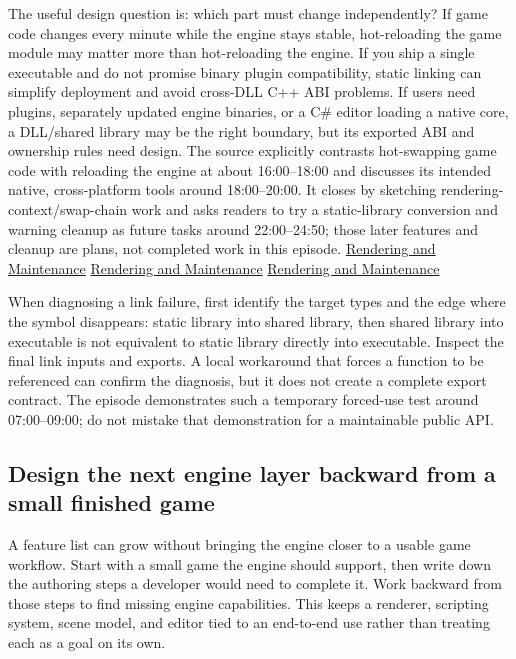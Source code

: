 The useful design question is: which part must change independently? If game code changes every minute while the engine stays stable, hot-reloading the game module may matter more than hot-reloading the engine. If you ship a single executable and do not promise binary plugin compatibility, static linking can simplify deployment and avoid cross-DLL C++ ABI problems. If users need plugins, separately updated engine binaries, or a C\# editor loading a native core, a DLL/shared library may be the right boundary, but its exported ABI and ownership rules need design. The source explicitly contrasts hot-swapping game code with reloading the engine at about 16:00--18:00 and discusses its intended native, cross-platform tools around 18:00--20:00. It closes by sketching rendering-context/swap-chain work and asks readers to try a static-library conversion and warning cleanup as future tasks around 22:00--24:50; those later features and cleanup are plans, not completed work in this episode. \href{https://www.youtube.com/watch?v=695SyEyFwWU&t=960s}{Rendering and Maintenance} \href{https://www.youtube.com/watch?v=695SyEyFwWU&t=1080s}{Rendering and Maintenance} \href{https://www.youtube.com/watch?v=695SyEyFwWU&t=1320s}{Rendering and Maintenance}

When diagnosing a link failure, first identify the target types and the edge where the symbol disappears: static library into shared library, then shared library into executable is not equivalent to static library directly into executable. Inspect the final link inputs and exports. A local workaround that forces a function to be referenced can confirm the diagnosis, but it does not create a complete export contract. The episode demonstrates such a temporary forced-use test around 07:00--09:00; do not mistake that demonstration for a maintainable public API.

\subsection{Design the next engine layer backward from a small finished game}\label{05-engine-i-ch013-design-the-next-engine-layer-backward-from-a-small-finished-game}

A feature list can grow without bringing the engine closer to a usable game workflow. Start with a small game the engine should support, then write down the authoring steps a developer would need to complete it. Work backward from those steps to find missing engine capabilities. This keeps a renderer, scripting system, scene model, and editor tied to an end-to-end use rather than treating each as a goal on its own.

